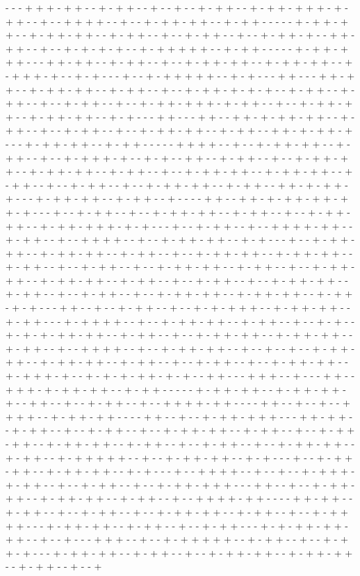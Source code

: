 - - - + + + - + + - - + - + + - - + - - + - - + - + + - - + - + + - + + + - + - + + - - + - - + + + + - - + - - + - + + - + + - - + - + + - - - - - + - + + - + + - - + - + + - + + - - + - + + - - + - - + - + + - - + - - + - + + - + - - + + - + + - - + - - + - + - + - + - - + - + + + + + - - + - + + - - - - - + - + + - + + + - - - + + - + + - - + - + + - - + - - + - + + - + + - - + - + + - + + - - + - + + + - + - - + - + - - - + - - + - + + + + + - - + - + - - - + + - - - + + - + + - - + - + + - + + - - + - + + - - + - - + - + + - + - + - + - - + - + + - - + - + + - - + - - + - + + - - + - - + - + + - + + + - + - + + - - + - - + - + + - + + - - + - + + - + + - - + - + - - - + + - - - + + - - + + - + - + + - + + - - + - + + - - + - - + - + + - - + - - + - + + - + + - - + - + + - - + + - + - + + - + - - - + - + + - + + - - + - + + - - - - - + + + + - - + - - + - + + - + + - - + - + + - - + - - + - + + + - + - - + - + - - + + - - + - + + - - + - - + - + + - + + - - + - + + - + + - - + - + + - - + - - + - + + - + + - - + - + + - + + - - + - + + - - + - - + - + + - - + - - + - + + - + + - - + - + + - - + + - + - + + - + - - - + - + + - + + - - + - + + - - + - - - - + + - - + + - + - + + - + + - + + - + - - - + - - + - + + - - + - - + - + + - + + - - + - + + - - + - - + - + + - + + - - + - + + - + + + - + - + - - - + - - + - + + - - + - - + + + + - + + - - + - + + - - + - - + + + + - - + - - + - + + - + + - - + - + - - - + - - + - + + - + + - - + - + + - + + - - + - + + - - + - - + - + + - + + - - + - + + - + + - - + - + + - - + - - + - + + - - + - - + - + + - + + - - + - + + - - + - - + - + + - + + - - + - + + - + + - - + - + + - - + - - + - + + - - + - - + - + + - + + - - + - + + - - + - - + - + + - - + - - + - + + - + + - - + - + + - + + - - + - + + - + - + - - - + + - - + - - + - + + - - + - - + - + - + + + - - + - + + - + + - - + - + + - - - + - + + + + - - + - - + - + + - + + - - + - + + - - + - - + - + - - + - + - + - + + - + + - - + - + + - - + - - + - + + - + + - - + - + + - + + - - + - + + - - + - - + + + + - - + - - + - + + - + + - - + - - + - - + - - + - + + - + + - - + - + + - + + - - + - + + - - + - - + - + + - - + - - + - + + - + + - - + - + + + - + - - + - + - + - + + - + - + - - + + - - - + + + - - + - - - + + - - + + + - + - + + - + + - - + - + + - - - - - + - + + - + + - - + - + + - + + - + - - + + - - + - - + - + + - - + - - + + + + - + + - - - - + + - - + - - + - - + + + + - - + - + + - + + - - - - + + - - + - - + - + + - + + + - - - + + - + + - - + - + + - - + - - + - + + - - + - - + - + + - + + - - + - + + - - + - - + - + + - + + - - + - + + - + + - - + - + + - - + - - + - + + - - + - - + - + + - + + - - + - + + - - + - + + + + + - - + - - + - + + - + + - - + - + - - - + - - + - + + - + + - - + - + + - + + - - + - + - - - + - - + + + + - - + - - + - - + - + + + - + - + + - - + - - + - + + - - + - - + - + + - + + + - - - + + - - + - - + - + + - + + - - + - + + - + + - - + - + + - - + - - + + + + - + + - - - - + + - + + - - + - + + - - + - - + - + + - - + - - + - + + - + + - - + - + + - - + - - + - + + + + - - - + - + + - + + - - + - + + - - + - - + - + + - - - + - + - + + - + + - + + - - + - - + - - - + + + - - + - - + - + + + + + - - + - + + - - + - - + - + + - + - - - + - + + - + + - - + - + + - - + - - + - + + - + + - - + - + + - + + - - + - + + - - + - - + 